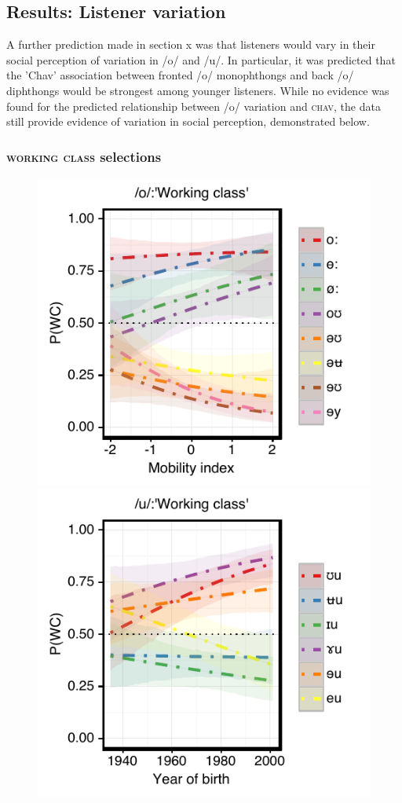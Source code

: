 \documentclass[PWPL]{article}
\begin{document}
\subsection{Results: Listener variation}
A further prediction made in section x was that listeners would vary in their social perception of variation in /o/ and /u/. In particular, it was predicted that the 'Chav' association between fronted /o/ monophthongs and back /o/ diphthongs would be strongest among younger listeners. While no evidence was found for the predicted relationship between /o/ variation and \textsc{chav}, the data still provide evidence of variation in social perception, demonstrated below.
\subsubsection{\textsc{working class} selections}
\begin{figure}[H]
\centering
\includegraphics[scale=0.8]{ow_class_dim3.pdf}
\includegraphics[scale=0.8]{uw_class_age.pdf}
\end{figure}
\end{document}
